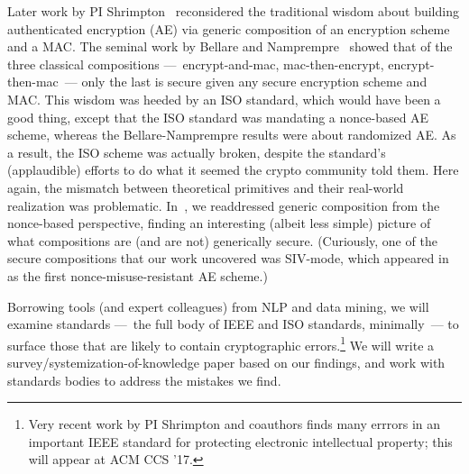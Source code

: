 Later work by PI Shrimpton~\cite{NRS} reconsidered the traditional wisdom about
building authenticated encryption (AE) via generic composition of an encryption
scheme and a MAC.   The seminal work by Bellare and Namprempre~\cite{BN} showed
that of the three classical compositions ---~encrypt-and-mac, mac-then-encrypt,
encrypt-then-mac~--- only the last is secure given any secure encryption scheme
and MAC.   This wisdom was heeded by an ISO standard, which would have been a
good thing, except that the ISO standard was mandating a nonce-based AE scheme,
whereas the Bellare-Namprempre results were about randomized AE.  As a result,
the ISO scheme was actually broken, despite the standard's (applaudible) efforts
to do what it seemed the crypto community told them.  Here again, the mismatch
between theoretical primitives and their real-world realization was problematic.
In~\cite{NRS}, we readdressed generic composition from the nonce-based
perspective, finding an interesting (albeit less simple) picture of what
compositions are (and are not) generically secure.  (Curiously, one of the
secure compositions that our work uncovered was SIV-mode, which
appeared in~\cite{RS06} as the first nonce-misuse-resistant AE scheme.)

\begin{task}
Borrowing tools (and expert colleagues) from NLP and data mining, we
will examine standards ---~the full body of IEEE and ISO standards,
minimally~--- to surface those that are likely to contain cryptographic
errors.\footnote{Very recent work by PI Shrimpton and coauthors finds many
errrors in an important IEEE standard for protecting electronic
intellectual property; this will appear at ACM CCS '17.}  We will
write a survey/systemization-of-knowledge paper based on our findings, and work with standards
bodies to address the mistakes we find.  
\end{task}




